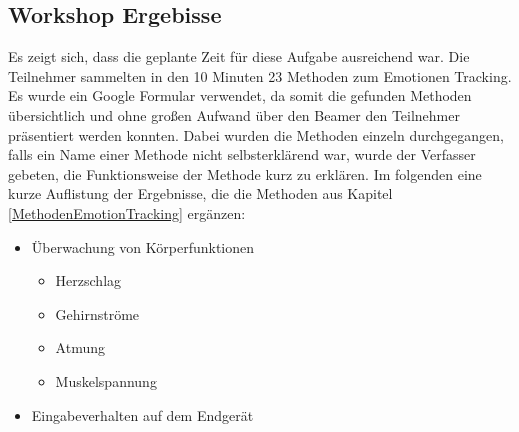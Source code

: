 \subsection{Workshop Ergebisse}

Es zeigt sich, dass die geplante Zeit für diese Aufgabe ausreichend war. Die Teilnehmer sammelten in den 10 Minuten 23 Methoden zum Emotionen Tracking. Es wurde ein Google Formular verwendet, da somit die gefunden Methoden übersichtlich und ohne großen Aufwand über den Beamer den Teilnehmer präsentiert werden konnten. Dabei wurden die Methoden einzeln durchgegangen, falls ein Name einer Methode nicht selbsterklärend war, wurde der Verfasser gebeten, die Funktionsweise der Methode kurz zu erklären. Im folgenden eine kurze Auflistung der Ergebnisse, die die Methoden aus Kapitel \ref{MethodenEmotionTracking} ergänzen:

\begin{itemize}
	\item Überwachung von Körperfunktionen
	\begin{itemize}
		\item Herzschlag
		\item Gehirnströme
		\item Atmung
		\item Muskelspannung
	\end{itemize}
	\item Eingabeverhalten auf dem Endgerät
	
\end{itemize}


